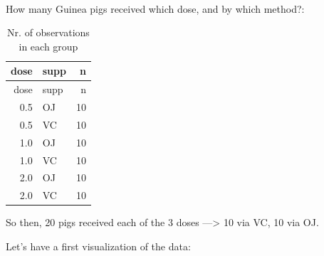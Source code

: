 \documentclass[]{article}
\newenvironment{Shaded}{\begin{snugshade}}{\end{snugshade}}
\newcommand{\DataTypeTok}[1]{\textcolor[rgb]{0.13,0.29,0.53}{#1}}
\newcommand{\KeywordTok}[1]{\textcolor[rgb]{0.13,0.29,0.53}{\textbf{#1}}}
\newcommand{\NormalTok}[1]{#1}
\newcommand{\OperatorTok}[1]{\textcolor[rgb]{0.81,0.36,0.00}{\textbf{#1}}}
\newcommand{\StringTok}[1]{\textcolor[rgb]{0.31,0.60,0.02}{#1}}
\begin{document}
~ ~ ~

How many Guinea pigs received which dose, and by which method?:

\begin{Shaded}
\end{Shaded}

\begin{longtable}[]{@{}rlr@{}}
\caption{Nr. of observations in each group}\tabularnewline
\toprule
dose & supp & n\tabularnewline
\midrule
\endfirsthead
\toprule
dose & supp & n\tabularnewline
\midrule
\endhead
0.5 & OJ & 10\tabularnewline
0.5 & VC & 10\tabularnewline
1.0 & OJ & 10\tabularnewline
1.0 & VC & 10\tabularnewline
2.0 & OJ & 10\tabularnewline
2.0 & VC & 10\tabularnewline
\bottomrule
\end{longtable}

So then, 20 pigs received each of the 3 doses ---\textgreater{} 10 via
VC, 10 via OJ.

\break

Let's have a first visualization of the data:

\begin{Shaded}
\end{Shaded}
\end{document}
